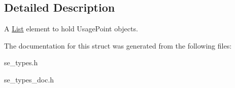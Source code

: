 \subsection{Detailed Description}
A \hyperlink{structList}{List} element to hold Usage\+Point objects. 

The documentation for this struct was generated from the following files\+:\begin{DoxyCompactItemize}
\item 
se\+\_\+types.\+h\item 
se\+\_\+types\+\_\+doc.\+h\end{DoxyCompactItemize}
